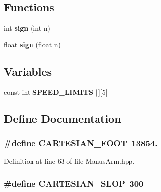 \subsection*{\-Functions}
\begin{DoxyCompactItemize}
\item 
int {\bf sign} (int n)
\item 
float {\bf sign} (float n)
\end{DoxyCompactItemize}
\subsection*{\-Variables}
\begin{DoxyCompactItemize}
\item 
const int {\bf \-S\-P\-E\-E\-D\-\_\-\-L\-I\-M\-I\-T\-S} [$\,$][5]
\end{DoxyCompactItemize}


\subsection{\-Define \-Documentation}
\subsubsection[{\-C\-A\-R\-T\-E\-S\-I\-A\-N\-\_\-\-F\-O\-O\-T}]{\setlength{\rightskip}{0pt plus 5cm}\#define {\bf \-C\-A\-R\-T\-E\-S\-I\-A\-N\-\_\-\-F\-O\-O\-T}~13854.}\label{ManusArm_8hpp_a148b505ab6c99cbd4895d8ba33055e9e}


\-Definition at line 63 of file \-Manus\-Arm.\-hpp.

\subsubsection[{\-C\-A\-R\-T\-E\-S\-I\-A\-N\-\_\-\-S\-L\-O\-P}]{\setlength{\rightskip}{0pt plus 5cm}\#define {\bf \-C\-A\-R\-T\-E\-S\-I\-A\-N\-\_\-\-S\-L\-O\-P}~300}\label{ManusArm_8hpp_ad06229aafee4a08b31b8bcfdc78aa918}


